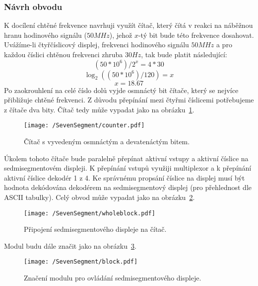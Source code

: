 \documentclass{report}
\begin{document}
\subsubsection{Návrh obvodu}
K docílení chtěné frekvence navrhuji využít čítač, který čítá v reakci na náběžnou hranu hodinového signálu ($50MHz$), jehož $x$-tý bit bude této frekvence dosahovat. Uvážíme-li čtyřčíslicový displej, frekvenci hodinového signálu $50MHz$ a pro každou číslici chtěnou frekvenci zhruba $30Hz$, tak bude platit následující:
\[(50*10^6)/2^x=4*30\]
\[\log_2  ((50*10^6)/120) = x\]
\[x = 18.67\]
Po zaokrouhlení na celé číslo dolů vyjde osmnáctý bit čítače, který se nejvíce přibližuje chtěné frekvenci. Z důvodu přepínání mezi čtyřmi číslicemi potřebujeme z čítače dva bity. Čítač tedy může vypadat jako na obrázku~\ref{fig:sscounter}.
\begin{figure}
\centering
\texttt{[image: /SevenSegment/counter.pdf]}
\caption{Čítač s vyvedeným osmnáctým a devatenáctým bitem.}
\label{fig:sscounter}
\end{figure}
Úkolem tohoto čítače bude paralelně přepínat aktivní vstupy a aktivní číslice na sedmisegmentovém displeji. K přepínání vstupů využiji multiplexor a k přepínání aktivní číslice dekodér 1 z 4. Ke správnému propsání číslice na displej musí být hodnota dekódována dekodérem na sedmisegmentový displej (pro přehlednost dle ASCII tabulky). Celý obvod může vypadat jako na obrázku~\ref{fig:wholeblock}.
\begin{figure}
\centering
\texttt{[image: /SevenSegment/wholeblock.pdf]}
\caption{Připojení sedmisegmentového displeje na čítač.}
\label{fig:wholeblock}
\end{figure}
Modul budu dále značit jako na obrázku~\ref{fig:block}.
\begin{figure}
\centering
\texttt{[image: /SevenSegment/block.pdf]}
\caption{Značení modulu pro ovládání sedmisegmentového displeje.}
\label{fig:block}
\end{figure}
\end{document}
